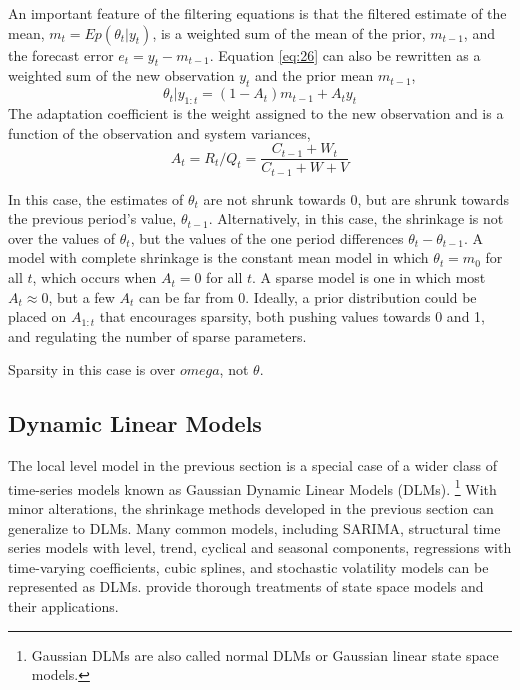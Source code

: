 \documentclass{article}
\begin{document}
An important feature of the filtering equations is that the filtered estimate of the mean, $m_{t} = E p(\theta_{t} | y_{t})$, is a weighted sum of the mean of the prior,  $m_{t - 1}$, and the forecast error $e_{t} = y_{t} - m_{t - 1}$.
Equation \eqref{eq:26} can also be rewritten as a weighted sum of the new observation $y_{t}$ and the prior mean $m_{t-1}$,
\begin{equation}
  \label{eq:18}
  \theta_{t} | y_{1:t} = (1 - A_{t}) m_{t-1} + A_{t} y_{t}
\end{equation}
The adaptation coefficient is the weight assigned to the new observation and is a function of the observation and system variances,
\begin{equation}
  \label{eq:24}
  A_{t} = R_{t} / Q_{t} = \frac{C_{t-1} + W_{t}}{C_{t-1} + W + V}
\end{equation}


In this case, the estimates of $\theta_{t}$ are not shrunk towards 0, but are shrunk towards the previous period's value, $\theta_{t-1}$.
Alternatively, in this case, the shrinkage is not over the values of $\theta_{t}$, but the values of the one period differences $\theta_{t} - \theta_{t -1}$.
A model with complete shrinkage is the constant mean model in which $\theta_{t} = m_{0}$ for all $t$, which occurs when $A_{t} = 0$ for all $t$.
A sparse model is one in which most $A_{t} \approx 0$, but a few $A_{t}$ can be far from 0.
Ideally, a prior distribution could be placed on $A_{1:t}$ that encourages sparsity, both pushing values towards 0 and 1, and regulating the number of sparse parameters.

Sparsity in this case is over $omega$, not $\theta$.

\subsection{Dynamic Linear Models}
\label{sec:dynam-line-models}

The local level model in the previous section is a special case of a wider class of time-series models known as Gaussian Dynamic Linear Models (DLMs).%
\footnote{Gaussian DLMs are also called normal DLMs or Gaussian linear state space models.}
With minor alterations, the shrinkage methods developed in the previous section can generalize to DLMs.
Many common models, including SARIMA, structural time series models with level, trend, cyclical and seasonal components, regressions with time-varying coefficients, cubic splines, and stochastic volatility models can be represented as DLMs. 
\textcites{WestHarrison1997}{DurbinKoopman2001}{CommandeurKoopman2007}{PetrisPetroneEtal2009}{ShumwayStoffer2010} provide thorough treatments of state space models and their applications.
\end{document}
